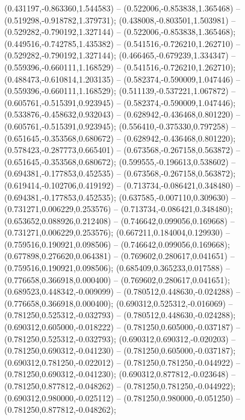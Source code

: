  (0.431197,-0.863360,1.544583) -- (0.522006,-0.853838,1.365468) -- (0.519298,-0.918782,1.379731);
 (0.438008,-0.803501,1.503981) -- (0.529282,-0.790192,1.327144) -- (0.522006,-0.853838,1.365468);
 (0.449516,-0.742785,1.435382) -- (0.541516,-0.726210,1.262710) -- (0.529282,-0.790192,1.327144);
 (0.466465,-0.679239,1.334347) -- (0.559396,-0.660111,1.168529) -- (0.541516,-0.726210,1.262710);
 (0.488473,-0.610814,1.203135) -- (0.582374,-0.590009,1.047446) -- (0.559396,-0.660111,1.168529);
 (0.511139,-0.537221,1.067872) -- (0.605761,-0.515391,0.923945) -- (0.582374,-0.590009,1.047446);
 (0.533876,-0.458632,0.932043) -- (0.628942,-0.436468,0.801220) -- (0.605761,-0.515391,0.923945);
 (0.556410,-0.375330,0.797258) -- (0.651645,-0.353568,0.680672) -- (0.628942,-0.436468,0.801220);
 (0.578423,-0.287773,0.665401) -- (0.673568,-0.267158,0.563872) -- (0.651645,-0.353568,0.680672);
 (0.599555,-0.196613,0.538602) -- (0.694381,-0.177853,0.452535) -- (0.673568,-0.267158,0.563872);
 (0.619414,-0.102706,0.419192) -- (0.713734,-0.086421,0.348480) -- (0.694381,-0.177853,0.452535);
 (0.637585,-0.007110,0.309630) -- (0.731271,0.006229,0.253576) -- (0.713734,-0.086421,0.348480);
 (0.653652,0.088926,0.212408) -- (0.746642,0.099056,0.169668) -- (0.731271,0.006229,0.253576);
 (0.667211,0.184004,0.129930) -- (0.759516,0.190921,0.098506) -- (0.746642,0.099056,0.169668);
 (0.677898,0.276620,0.064381) -- (0.769602,0.280617,0.041651) -- (0.759516,0.190921,0.098506);
 (0.685409,0.365233,0.017588) -- (0.776658,0.366918,0.000400) -- (0.769602,0.280617,0.041651);
 (0.689523,0.448342,-0.009099) -- (0.780512,0.448630,-0.024288) -- (0.776658,0.366918,0.000400);
 (0.690312,0.525312,-0.016069) -- (0.781250,0.525312,-0.032793) -- (0.780512,0.448630,-0.024288);
 (0.690312,0.605000,-0.018222) -- (0.781250,0.605000,-0.037187) -- (0.781250,0.525312,-0.032793);
 (0.690312,0.690312,-0.020203) -- (0.781250,0.690312,-0.041230) -- (0.781250,0.605000,-0.037187);
 (0.690312,0.781250,-0.022012) -- (0.781250,0.781250,-0.044922) -- (0.781250,0.690312,-0.041230);
 (0.690312,0.877812,-0.023648) -- (0.781250,0.877812,-0.048262) -- (0.781250,0.781250,-0.044922);
 (0.690312,0.980000,-0.025112) -- (0.781250,0.980000,-0.051250) -- (0.781250,0.877812,-0.048262);
